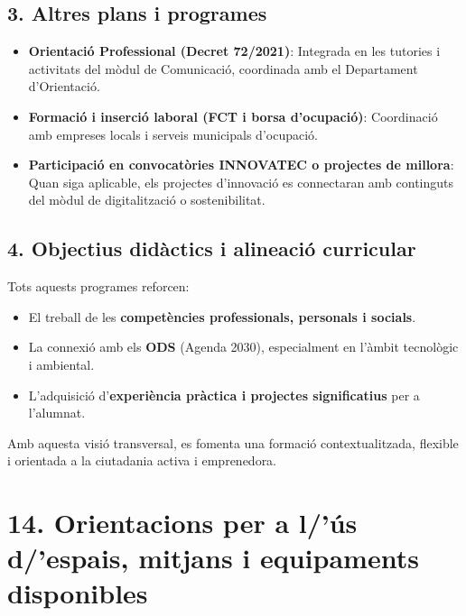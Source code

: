 \documentclass[
  paper=a4,
  ,captions=tableheading
]{scrartcl}
\providecommand{\tightlist}{%
  \setlength{\itemsep}{0pt}\setlength{\parskip}{0pt}}
\begin{document}
\hypertarget{altres-plans-i-programes}{%
\subsection{3. Altres plans i
programes}\label{altres-plans-i-programes}}

\begin{itemize}
\tightlist
\item
  \textbf{Orientació Professional (Decret 72/2021)}: Integrada en les
  tutories i activitats del mòdul de Comunicació, coordinada amb el
  Departament d'Orientació.
\item
  \textbf{Formació i inserció laboral (FCT i borsa d'ocupació)}:
  Coordinació amb empreses locals i serveis municipals d'ocupació.
\item
  \textbf{Participació en convocatòries INNOVATEC o projectes de
  millora}: Quan siga aplicable, els projectes d'innovació es
  connectaran amb continguts del mòdul de digitalització o
  sostenibilitat.
\end{itemize}

\hypertarget{objectius-diduxe0ctics-i-alineaciuxf3-curricular}{%
\subsection{4. Objectius didàctics i alineació
curricular}\label{objectius-diduxe0ctics-i-alineaciuxf3-curricular}}

Tots aquests programes reforcen:

\begin{itemize}
\tightlist
\item
  El treball de les \textbf{competències professionals, personals i
  socials}.
\item
  La connexió amb els \textbf{ODS} (Agenda 2030), especialment en
  l'àmbit tecnològic i ambiental.
\item
  L'adquisició d'\textbf{experiència pràctica i projectes significatius}
  per a l'alumnat.
\end{itemize}

Amb aquesta visió transversal, es fomenta una formació contextualitzada,
flexible i orientada a la ciutadania activa i emprenedora.

\hypertarget{orientacions-per-a-luxfas-despais-mitjans-i-equipaments-disponibles}{%
\section{14. Orientacions per a l/'ús d/'espais, mitjans i equipaments
disponibles}\label{orientacions-per-a-luxfas-despais-mitjans-i-equipaments-disponibles}}
\end{document}
